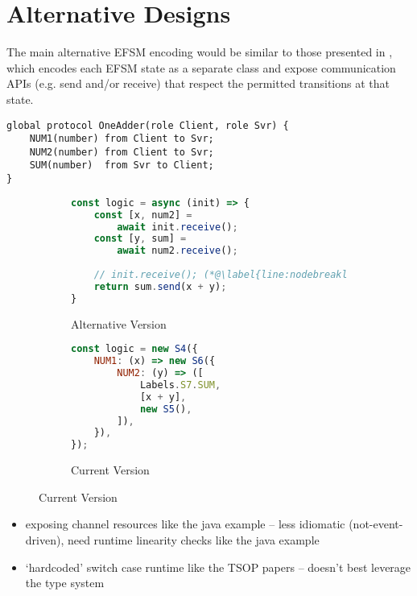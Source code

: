 \section{Alternative Designs}
\label{section:nodealt}

The main alternative EFSM encoding would be similar to those
presented in \cite{Hybrid2016}, which encodes
each EFSM state as a separate class and expose communication APIs
(e.g. send and/or receive) that respect the permitted transitions at
that state. 

\begin{lstlisting}[language=scribble]
global protocol OneAdder(role Client, role Svr) {
	NUM1(number) from Client to Svr;
	NUM2(number) from Client to Svr;
	SUM(number)  from Svr to Client;
}
\end{lstlisting}

\begin{figure}[!h]
\centering
\begin{subfigure}{0.49\textwidth}
\begin{lstlisting}[language=javascript,tabsize=2]
const logic = async (init) => {
	const [x, num2] = 
		await init.receive();
 	const [y, sum] = 
 		await num2.receive();
 		
 	// init.receive(); (*@\label{line:nodebreaklinear}@*)
	return sum.send(x + y);
}
\end{lstlisting}
\caption{Alternative Version}
\end{subfigure}
\hfill
\begin{subfigure}{0.49\textwidth}
\begin{lstlisting}[language=javascript,tabsize=2]
const logic = new S4({
	NUM1: (x) => new S6({
		NUM2: (y) => ([
			Labels.S7.SUM,
			[x + y],
			new S5(),
		]),
	}),
});

\end{lstlisting}
\caption{Current Version}
\end{subfigure}
\end{figure}

\begin{itemize}
\item exposing channel resources like the java example -- less idiomatic (not-event-driven), need runtime linearity checks like the java example
\item `hardcoded' switch case runtime like the TSOP papers -- doesn't best leverage the type system
\end{itemize}